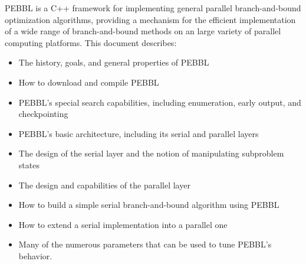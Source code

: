 PEBBL is a C++ framework for implementing general parallel
branch-and-bound optimization algorithms, providing a mechanism for
the efficient implementation of a wide range of branch-and-bound
methods on an large variety of parallel computing platforms.
This document describes:
\begin{itemize}
\item The history, goals, and general properties of PEBBL
\item How to download and compile PEBBL
\item PEBBL's special search capabilities, including enumeration,
  early output, and checkpointing
\item PEBBL's basic architecture, including its serial and parallel layers
\item The design of the serial layer and the notion of manipulating
  subproblem states
\item The design and capabilities of the parallel layer
\item How to build a simple serial branch-and-bound algorithm using
  PEBBL
\item How to extend a serial implementation into a parallel one
\item Many of the numerous parameters that can be used to 
tune PEBBL's behavior.
\end{itemize}

